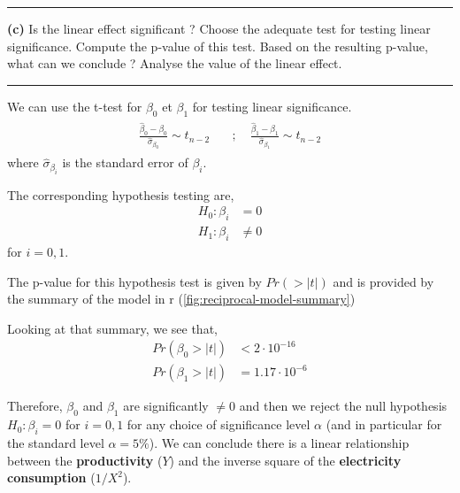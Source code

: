 
\begin{center}\rule{6cm}{0.4pt}\end{center}

\textbf{(c)} Is the linear effect significant ? Choose the adequate test for testing linear significance. Compute the p-value of this test. Based on the resulting p-value, what can we conclude ? Analyse the value of the linear effect.

\begin{center}\rule{6cm}{0.4pt}\end{center}

We can use the t-test for $\beta_0$ et $\beta_1$ for testing linear significance.
\begin{align*}
  \begin{array}{rl}
    \frac{\hat{\beta}_0 - \beta_0}{\hat{\sigma}_{\beta_0}} \sim t_{n-2} \quad &; \quad 
    \frac{\hat{\beta}_1 - \beta_1}{\hat{\sigma}_{\beta_1}} \sim t_{n-2}
  \end{array}
\end{align*}
where $\hat{\sigma}_{\beta_i}$ is the standard error of $\beta_i$.

The corresponding hypothesis testing are, 
\begin{align*}
  H_0: \beta_i &= 0 \\
  H_1: \beta_i &\neq 0
\end{align*}
for $i = 0,1$. 

The p-value for this hypothesis test is given by $Pr(> |t|)$ and is provided by the summary of the model in r (\autoref{fig:reciprocal-model-summary}) 

Looking at that summary, we see that, 
\begin{align*}
  Pr(\beta_0 > |t|) &< 2 \cdot 10^{-16} \\
  Pr(\beta_1 > |t|) &= 1.17 \cdot 10^{-6}
\end{align*}

Therefore, $\beta_0$ and $\beta_1$ are significantly $\neq 0$ and then we reject the null hypothesis $H_0: \beta_i = 0$ for $i = 0,1$ for any choice of significance level $\alpha$ (and in particular for the standard level $\alpha = 5\%$). We can conclude there is a linear relationship between the \textbf{productivity} ($Y$) and the inverse square of the \textbf{electricity consumption} ($1/X^2$).